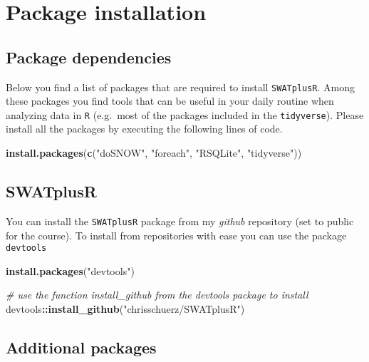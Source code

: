 \documentclass[11pt,]{article}
\newenvironment{Shaded}{\begin{snugshade}}{\end{snugshade}}
\newcommand{\KeywordTok}[1]{\textcolor[rgb]{0.13,0.29,0.53}{\textbf{#1}}}
\newcommand{\StringTok}[1]{\textcolor[rgb]{0.31,0.60,0.02}{#1}}
\newcommand{\CommentTok}[1]{\textcolor[rgb]{0.56,0.35,0.01}{\textit{#1}}}
\newcommand{\OperatorTok}[1]{\textcolor[rgb]{0.81,0.36,0.00}{\textbf{#1}}}
\newcommand{\NormalTok}[1]{#1}
\begin{document}
\section{Package installation}\label{package-installation}

\subsection{Package dependencies}\label{package-dependencies}

Below you find a list of packages that are required to install
\texttt{SWATplusR}. Among these packages you find tools that can be
useful in your daily routine when analyzing data in \texttt{R}
(e.g.~most of the packages included in the \texttt{tidyverse}). Please
install all the packages by executing the following lines of code.

\begin{Shaded}
\begin{Highlighting}[]
\KeywordTok{install.packages}\NormalTok{(}\KeywordTok{c}\NormalTok{(}\StringTok{"doSNOW"}\NormalTok{, }\StringTok{"foreach"}\NormalTok{, }\StringTok{"RSQLite"}\NormalTok{, }\StringTok{"tidyverse"}\NormalTok{))}
\end{Highlighting}
\end{Shaded}

\subsection{SWATplusR}\label{swatplusr}

You can install the \texttt{SWATplusR} package from my \emph{github}
repository (set to public for the course). To install from repositories
with ease you can use the package \texttt{devtools}

\begin{Shaded}
\begin{Highlighting}[]
\KeywordTok{install.packages}\NormalTok{(}\StringTok{"devtools"}\NormalTok{)}

\CommentTok{# use the function install_github from the devtools package to install}
\NormalTok{devtools}\OperatorTok{::}\KeywordTok{install_github}\NormalTok{(}\StringTok{"chrisschuerz/SWATplusR"}\NormalTok{)}
\end{Highlighting}
\end{Shaded}

\subsection{Additional packages}\label{additional-packages}
\end{document}
